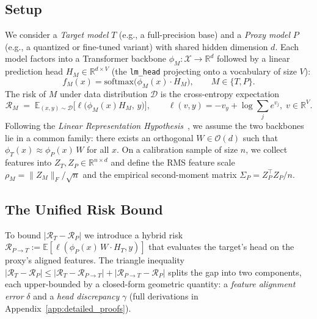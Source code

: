 \documentclass{article}
\begin{document}
\subsection{Setup}
\label{subsec:problem_setup}

We consider a \emph{Target model} $T$ (e.g., a full-precision base) and a \emph{Proxy model} $P$ (e.g., a quantized or fine-tuned variant) with shared hidden dimension $d$. Each model factors into a Transformer backbone $\phi_M: \mathcal{X} \to \mathbb{R}^d$ followed by a linear prediction head $H_M \in \mathbb{R}^{d \times V}$ (the \texttt{lm\_head} projecting onto a vocabulary of size $V$):
\begin{equation}
f_M(x) = \mathrm{softmax}\!\big(\phi_M(x) \cdot H_M\big), \qquad M \in \{T, P\}.
\end{equation}
The risk of $M$ under data distribution $\mathcal{D}$ is the cross-entropy expectation
\begin{equation}
\label{eq:ce_def}
\mathcal{R}_M \;=\; \mathbb{E}_{(x,y) \sim \mathcal{D}}\!\big[\ell\big(\phi_M(x) H_M,\, y\big)\big], \qquad \ell(v, y) = -v_y + \log \textstyle\sum_{j} e^{v_j}, \; v \in \mathbb{R}^V.
\end{equation}
Following the \emph{Linear Representation Hypothesis}~\cite{moschella2022relative, park2023linear}, we assume the two backbones lie in a common family: there exists an orthogonal $W \in \mathcal{O}(d)$ such that $\phi_T(x) \approx \phi_P(x)\, W$ for all $x$. On a calibration sample of size $n$, we collect features into $Z_T, Z_P \in \mathbb{R}^{n \times d}$ and define the RMS feature scale $\rho_M = \|Z_M\|_F / \sqrt{n}$ and the empirical second-moment matrix $\Sigma_P = Z_P^\top Z_P / n$.


\subsection{The Unified Risk Bound}
\label{subsec:unified_bound}

To bound $|\mathcal{R}_T - \mathcal{R}_P|$ we introduce a hybrid risk $\mathcal{R}_{P \to T} := \mathbb{E}[\ell(\phi_P(x)\,W \cdot H_T, y)]$ that evaluates the target's head on the proxy's aligned features. The triangle inequality $|\mathcal{R}_T - \mathcal{R}_P| \le |\mathcal{R}_T - \mathcal{R}_{P\to T}| + |\mathcal{R}_{P\to T} - \mathcal{R}_P|$ splits the gap into two components, each upper-bounded by a closed-form geometric quantity: a \emph{feature alignment error} $\delta$ and a \emph{head discrepancy} $\gamma$ (full derivations in Appendix~\ref{app:detailed_proofs}).
\end{document}
